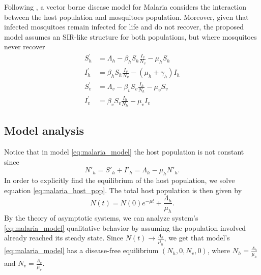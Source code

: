 \documentclass{book}\usepackage[]{graphicx}\usepackage[]{color}
\begin{document}
Following \cite{brauer2019mathematical}, a vector borne disease model for Malaria considers the interaction between the host population and mosquitoes population. Moreover, given that infected mosquitoes remain infected for life and do not recover, the proposed model assumes an SIR-like structure for both populations, but where mosquitoes never recover
%
\begin{align} 
\label{eq:malaria_model}
\nonumber S_{h}^{\prime}&=\Lambda_{h}-\beta_h S_{h} \frac{I_{v}}{N_{v}}-\mu_{h} S_{h} \\
 I_{h}^{\prime}&=\beta_h S_{h} \frac{I_{v}}{N_{v}}-\left(\mu_{h}+\gamma_{h}\right) I_{h} \\
\nonumber S_{v}^{\prime}&=\Lambda_{v}-\beta_v S_{v} \frac{I_{h}}{N_{h}}-\mu_{v} S_{v} \\
\nonumber I_{v}^{\prime}&=\beta_v S_{v} \frac{I_{h}}{N_{h}}-\mu_{v} I_{v}
\end{align}
%

\subsection*{Model analysis}
Notice that in model \eqref{eq:malaria_model} the host population is not constant since
\begin{equation} \label{eq:malaria_host_pop}
   N'_h=S'_h+I'_h=\Lambda_h-\mu_h N'_h.
\end{equation}
In order to explicitly find the equilibrium of the host population, we solve equation \eqref{eq:malaria_host_pop}. The total host population is then given by $$N(t)=N(0)e^{-\mu t}+\frac{\Lambda_h}{\mu_h}.$$ By the theory of asymptotic systems, we can analyze system's \eqref{eq:malaria_model} qualitative behavior by assuming the population involved already reached its steady state. Since $N(t)\rightarrow \frac{\Lambda_h}{\mu_h}$, we get that model's \eqref{eq:malaria_model} has a disease-free equilibrium $(N_h,0,N_v,0)$, where $N_h=\frac{\Lambda_h}{\mu_h}$ and $N_v=\frac{\Lambda_v}{\mu_v}$. 
\end{document}
